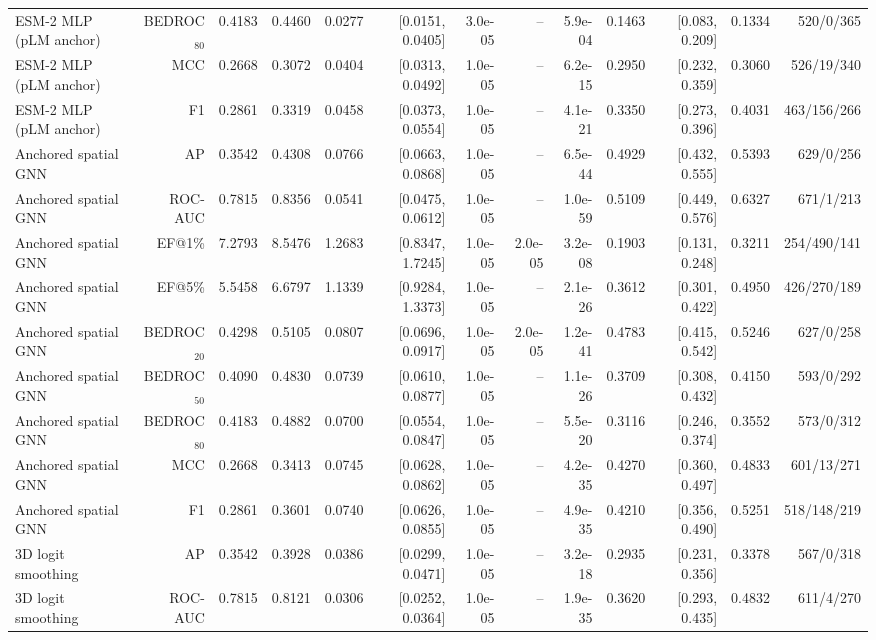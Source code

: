 \begin{table}[t]
\begin{tabular}{lrrrrrrrrrrrr}
ESM-2 MLP (pLM anchor) & BEDROC$_{80}$ & 0.4183 & 0.4460 & 0.0277 & [0.0151, 0.0405] & 3.0e-05 & -- & 5.9e-04 & 0.1463 & [0.083, 0.209] & 0.1334 & 520/0/365 \\
ESM-2 MLP (pLM anchor) & MCC & 0.2668 & 0.3072 & 0.0404 & [0.0313, 0.0492] & 1.0e-05 & -- & 6.2e-15 & 0.2950 & [0.232, 0.359] & 0.3060 & 526/19/340 \\
ESM-2 MLP (pLM anchor) & F1 & 0.2861 & 0.3319 & 0.0458 & [0.0373, 0.0554] & 1.0e-05 & -- & 4.1e-21 & 0.3350 & [0.273, 0.396] & 0.4031 & 463/156/266 \\
Anchored spatial GNN & AP & 0.3542 & 0.4308 & 0.0766 & [0.0663, 0.0868] & 1.0e-05 & -- & 6.5e-44 & 0.4929 & [0.432, 0.555] & 0.5393 & 629/0/256 \\
Anchored spatial GNN & ROC-AUC & 0.7815 & 0.8356 & 0.0541 & [0.0475, 0.0612] & 1.0e-05 & -- & 1.0e-59 & 0.5109 & [0.449, 0.576] & 0.6327 & 671/1/213 \\
Anchored spatial GNN & EF@1\% & 7.2793 & 8.5476 & 1.2683 & [0.8347, 1.7245] & 1.0e-05 & 2.0e-05 & 3.2e-08 & 0.1903 & [0.131, 0.248] & 0.3211 & 254/490/141 \\
Anchored spatial GNN & EF@5\% & 5.5458 & 6.6797 & 1.1339 & [0.9284, 1.3373] & 1.0e-05 & -- & 2.1e-26 & 0.3612 & [0.301, 0.422] & 0.4950 & 426/270/189 \\
Anchored spatial GNN & BEDROC$_{20}$ & 0.4298 & 0.5105 & 0.0807 & [0.0696, 0.0917] & 1.0e-05 & 2.0e-05 & 1.2e-41 & 0.4783 & [0.415, 0.542] & 0.5246 & 627/0/258 \\
Anchored spatial GNN & BEDROC$_{50}$ & 0.4090 & 0.4830 & 0.0739 & [0.0610, 0.0877] & 1.0e-05 & -- & 1.1e-26 & 0.3709 & [0.308, 0.432] & 0.4150 & 593/0/292 \\
Anchored spatial GNN & BEDROC$_{80}$ & 0.4183 & 0.4882 & 0.0700 & [0.0554, 0.0847] & 1.0e-05 & -- & 5.5e-20 & 0.3116 & [0.246, 0.374] & 0.3552 & 573/0/312 \\
Anchored spatial GNN & MCC & 0.2668 & 0.3413 & 0.0745 & [0.0628, 0.0862] & 1.0e-05 & -- & 4.2e-35 & 0.4270 & [0.360, 0.497] & 0.4833 & 601/13/271 \\
Anchored spatial GNN & F1 & 0.2861 & 0.3601 & 0.0740 & [0.0626, 0.0855] & 1.0e-05 & -- & 4.9e-35 & 0.4210 & [0.356, 0.490] & 0.5251 & 518/148/219 \\
3D logit smoothing & AP & 0.3542 & 0.3928 & 0.0386 & [0.0299, 0.0471] & 1.0e-05 & -- & 3.2e-18 & 0.2935 & [0.231, 0.356] & 0.3378 & 567/0/318 \\
3D logit smoothing & ROC-AUC & 0.7815 & 0.8121 & 0.0306 & [0.0252, 0.0364] & 1.0e-05 & -- & 1.9e-35 & 0.3620 & [0.293, 0.435] & 0.4832 & 611/4/270 \\

\end{tabular}
\end{table}
